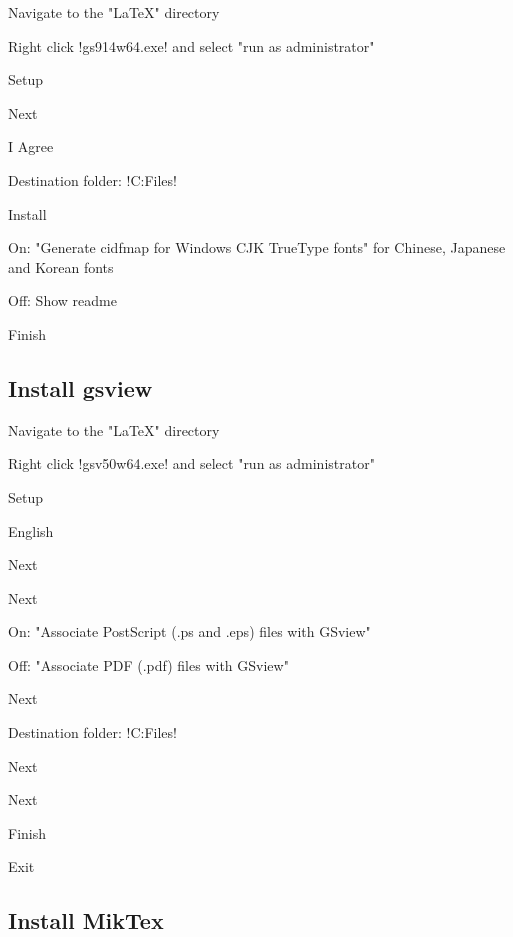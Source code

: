 \begin{enumerate*}
\item Navigate to the "LaTeX" directory
\item Right click !gs914w64.exe! and select "run as administrator"
\item Setup
\item Next
\item I Agree
\item Destination folder: !C:\Program Files\gs{}!
\item Install
\item On: "Generate cidfmap for Windows CJK TrueType fonts" for Chinese,
      Japanese and Korean fonts
\item Off: Show readme
\item Finish
\end{enumerate*}

\subsection{Install gsview}

\begin{enumerate*}
\item Navigate to the "LaTeX" directory
\item Right click !gsv50w64.exe! and select "run as administrator"
\item Setup
\item English
\item Next
\item Next
\item On: "Associate PostScript (.ps and .eps) files with GSview"
\item Off: "Associate PDF (.pdf) files with GSview"
\item Next
\item Destination folder: !C:\Program Files\Ghostgum!
\item Next
\item Next
\item Finish
\item Exit
\end{enumerate*}

\subsection{Install MikTex}

